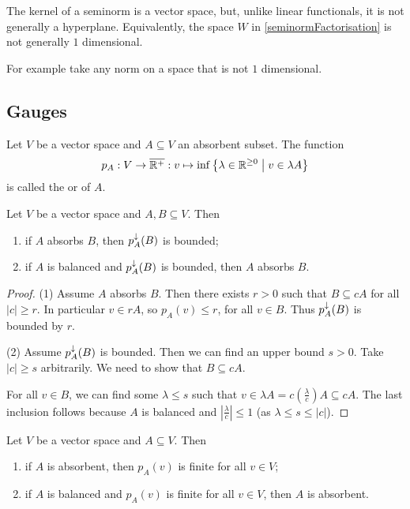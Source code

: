 \begin{example}
The kernel of a seminorm is a vector space, but, unlike linear functionals, it is not generally a hyperplane. Equivalently, the space $W$ in \ref{seminormFactorisation} is not generally $1$ dimensional.

For example take any norm on a space that is not $1$ dimensional.
\end{example}


\subsection{Gauges}
\begin{definition}
Let $V$ be a vector space and $A\subseteq V$ an absorbent subset. The function
\[ p_A: V\to \overline{\R^+}: v\mapsto \inf\setbuilder{\lambda\in \R^{\geq 0}}{v\in \lambda A} \]
is called the  or  of $A$.
\end{definition}

\begin{lemma}
Let $V$ be a vector space and $A,B\subseteq V$. Then
\begin{enumerate}
\item if $A$ absorbs $B$, then $p_A^\downarrow(B)$ is bounded;
\item if $A$ is balanced and $p_A^\downarrow(B)$ is bounded, then $A$ absorbs $B$.
\end{enumerate}
\end{lemma}
\begin{proof}
(1) Assume $A$ absorbs $B$. Then there exists $r >0$ such that $B\subseteq cA$ for all $|c|\geq r$. In particular $v\in rA$, so $p_A(v) \leq r$, for all $v\in B$. Thus $p_A^\downarrow(B)$ is bounded by $r$.

(2) Assume $p_A^\downarrow(B)$ is bounded. Then we can find an upper bound $s>0$. Take $|c|\geq s$ arbitrarily. We need to show that $B\subseteq cA$.

For all $v\in B$, we can find some $\lambda \leq s$ such that $v\in\lambda A = c\left(\frac{\lambda}{c}\right)A \subseteq cA$. The last inclusion follows because $A$ is balanced and $\left|\frac{\lambda}{c}\right|\leq 1$ (as $\lambda \leq s \leq |c|$).
\end{proof}
\begin{corollary} \label{gaugeWellDefined}
Let $V$ be a vector space and $A\subseteq V$. Then
\begin{enumerate}
\item if $A$ is absorbent, then $p_A(v)$ is finite for all $v\in V$;
\item if $A$ is balanced and $p_A(v)$ is finite for all $v\in V$, then $A$ is absorbent.
\end{enumerate}
\end{corollary}

